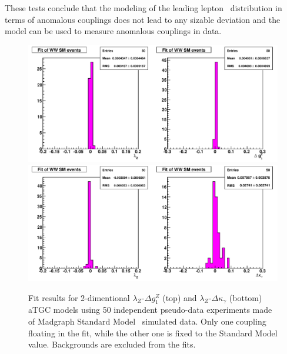 These tests conclude that the modeling of the leading lepton \pt\
distribution in terms of anomalous couplings does not lead to any
sizable deviation and the model can be used to measure anomalous
couplings in data.

\begin{figure}[tp]
  \centering
    \includegraphics[width=1.0\textwidth]{figures/fit_ww_mc_1D}
    \includegraphics[width=1.0\textwidth]{figures/fit_ww_mc_1D_2}

  \caption[1D fits to WW SM Monte Carlo] {Fit results for
  2-dimentional $\lambda_{Z}$-$\Delta g^Z_1$ (top) and
  $\lambda_{Z}$-$\Delta\kappa_\gamma$ (bottom) aTGC models using 50
  independent pseudo-data experiments made of Madgraph Standard
  Model \ww\ simulated data. Only one coupling floating in the fit,
  while the other one is fixed to the Standard Model
  value. Backgrounds are excluded from the fits.}

\label{fig:fit_ww_mc_1D}
\end{figure}




